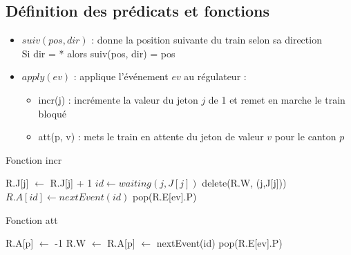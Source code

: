 \documentclass[12pt]{article}
\begin{document}
\subsection{Définition des prédicats et fonctions}

\begin{itemize}
    \item $suiv(pos, dir)$ : donne la position suivante du train selon sa direction
    \\Si dir = * alors suiv(pos, dir) = pos 
    \item $apply(ev)$ : applique l'événement $ev$ au régulateur : 
    \begin{itemize}
        \item incr(j) : incrémente la valeur du jeton $j$ de 1 et remet en marche le train bloqué
        \item att(p, v) : mets le train en attente du jeton de valeur $v$ pour le canton $p$
    \end{itemize}
\end{itemize}

\begin{algorithm}
\caption{Fonction incr}
    \begin{algorithmic}[1]
         
            \State R.J[j] $\gets$ R.J[j] + 1
            \State $id \gets waiting(j,J[j])$ 
                \State delete(R.W, (j,J[j])) 
                \State $R.A[id] \gets nextEvent(id)$  
            \EndIf
            \State pop(R.E[ev].P) 
        \EndFunction
    \end{algorithmic}
\end{algorithm}


\begin{algorithm}
    \caption{Fonction att}
        \begin{algorithmic}[2]
         
                \State R.A[p] $\gets$ -1
                \State R.W $\gets$  
            \Else {}
                \State R.A[p] $\gets$ nextEvent(id)
            \EndIf
            \State pop(R.E[ev].P) 
        \EndFunction
    \end{algorithmic}
\end{algorithm}
\end{document}
